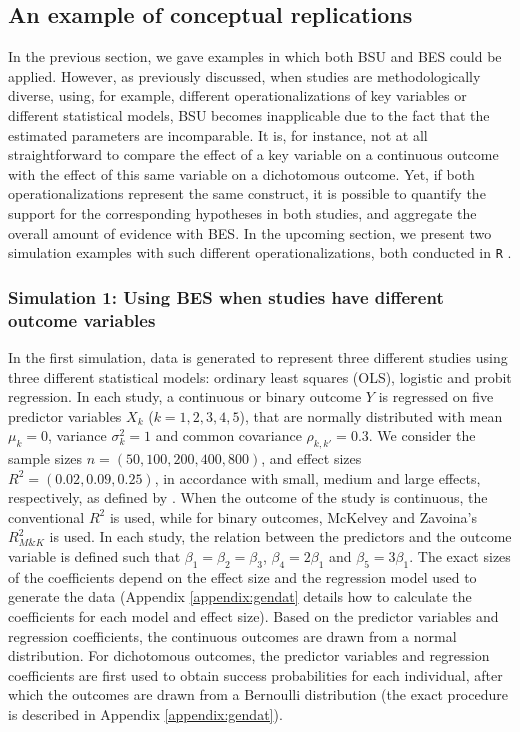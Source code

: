 \documentclass[11pt,reqno]{article}
\begin{document}
\subsection{An example of conceptual replications}\label{GLMexample}

In the previous section, we gave examples in which both BSU and BES could be applied. However, as previously discussed, when studies are methodologically diverse, using, for example, different operationalizations of key variables or different statistical models, BSU becomes inapplicable due to the fact that the estimated parameters are incomparable. It is, for instance, not at all straightforward to compare the effect of a key variable on a continuous outcome with the effect of this same variable on a dichotomous outcome. Yet, if both operationalizations represent the same construct, it is possible to quantify the support for the corresponding hypotheses in both studies, and aggregate the overall amount of evidence with BES. In the upcoming section, we present two simulation examples with such different operationalizations, both conducted in \texttt{R} \autocite[][Version 4.2.1]{R}.

\subsubsection{Simulation 1: Using BES when studies have different outcome variables}


In the first simulation, data is generated to represent three different studies using three different statistical models: ordinary least squares (OLS), logistic and probit regression.
In each study, a continuous or binary outcome $Y$ is regressed on five predictor variables $X_k$ ($k = 1,2,3,4,5$), that are normally distributed with mean $\mu_k = 0$, variance $\sigma^2_{k} = 1$ and common covariance $\rho_{k,k'} = 0.3$.
We consider the sample sizes $n = (50, 100, 200, 400, 800)$, and effect sizes $R^2 = (0.02, 0.09, 0.25)$, in accordance with small, medium and large effects, respectively, as defined by \textcite{cohen_1988}.
When the outcome of the study is continuous, the conventional $R^2$ is used, while for binary outcomes, McKelvey and Zavoina's $R^2_{M\&K}$ \autocite*{mckelvey_zavoina_1975} is used.
In each study, the relation between the predictors and the outcome variable is defined such that $\beta_1 = \beta_2 = \beta_3$, $\beta_4 = 2 \beta_1$ and $\beta_5 = 3\beta_1$.
The exact sizes of the coefficients depend on the effect size and the regression model used to generate the data (Appendix \ref{appendix:gendat} details how to calculate the coefficients for each model and effect size).
Based on the predictor variables and regression coefficients, the continuous outcomes are drawn from a normal distribution.
For dichotomous outcomes, the predictor variables and regression coefficients are first used to obtain success probabilities for each individual, after which the outcomes are drawn from a Bernoulli distribution (the exact procedure is described in Appendix \ref{appendix:gendat}).
\end{document}
